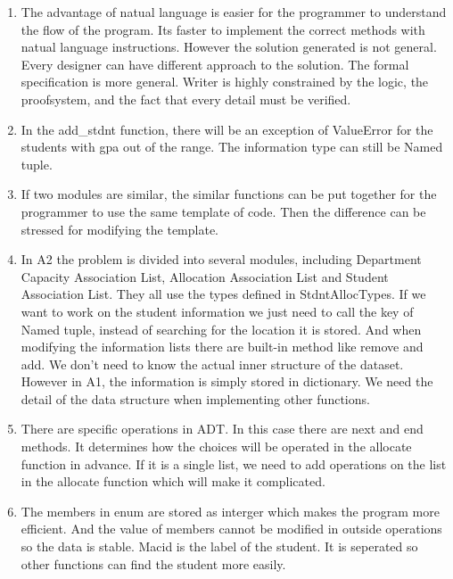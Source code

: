 \documentclass[12pt]{article}
\begin{document}
\begin{enumerate}

\item The advantage of natual language is easier for the programmer to understand the flow of the program. Its faster to implement the correct methods with natual language instructions. However the solution generated is not general. Every designer can have different approach to the solution. The formal specification is more general. Writer is highly constrained by the logic, the proofsystem, and the fact that every detail must be verified.
\item In the add\_stdnt function, there will be an exception of ValueError for the students with gpa out of the range. The information type can still be Named tuple.
\item If two modules are similar, the similar functions can be put together for the programmer to use the same template of code. Then the difference can be stressed for modifying the template.
\item In A2 the problem is divided into several modules, including Department Capacity Association List, Allocation Association List and Student Association List. They all use the types defined in StdntAllocTypes. If we want to work on the student information we just need to call the key of Named tuple, instead of searching for the location it is stored. And when modifying the information lists there are built-in method like remove and add. We don't need to know the actual inner structure of the dataset. However in A1, the information is simply stored in dictionary. We need the detail of the data structure when implementing other functions.
\item There are specific operations in ADT. In this case there are next and end methods. It determines how the choices will be operated in the allocate function in advance. If it is a single list, we need to add operations on the list in the allocate function which will make it complicated.
\item The members in enum are stored as interger which makes the program more efficient. And the value of members cannot be modified in outside operations so the data is stable. Macid is the label of the student. It is seperated so other functions can find the student more easily.
\end{enumerate}

\newpage

\lstset{language=Python, basicstyle=\tiny, breaklines=true, showspaces=false,
  showstringspaces=false, breakatwhitespace=true}
\end{document}
